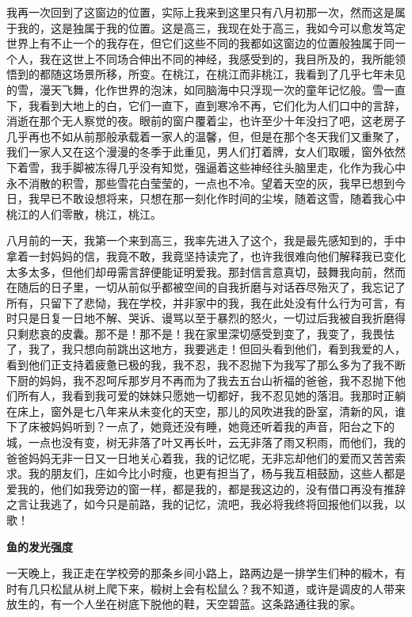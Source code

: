\documentclass{ctexbook}
\begin{document}
    我再一次回到了这窗边的位置，实际上我来到这里只有八月初那一次，然而这是属于我的，这是独属于我的位置。这是高三，我现在处于高三，我如今可以愈发笃定世界上有不止一个的我存在，但它们这些不同的我都如这窗边的位置般独属于同一个人，我在这世上不同场合伸出不同的神经，我感受到的，我目所及的，我所能领悟到的都随这场景所移，所变。在桃江，在桃江而非桃江，我看到了几乎七年未见的雪，漫天飞舞，化作世界的泡沫，如同脑海中只浮现一次的童年记忆般。雪一直下，我看到大地上的白，它们一直下，直到寒冷不再，它们化为人们口中的言辞，消逝在那个无人察觉的夜。眼前的窗户覆着尘，也许至少十年没扫了吧，这老房子几乎再也不如从前那般承载着一家人的温馨，但，但是在那个冬天我们又重聚了，我们一家人又在这个漫漫的冬季于此重见，男人们打着牌，女人们取暖，窗外依然下着雪，我手脚被冻得几乎没有知觉，强逼着这些神经往头脑里走，化作为我心中永不消散的积雪，那些雪花白莹莹的，一点也不冷。望着天空的灰，我早已想到今日，我早已不敢设想将来，只想在那一刻化作时间的尘埃，随着这雪，随着我心中桃江的人们零散，桃江，桃江。

    八月前的一天，我第一个来到高三，我率先进入了这个，我是最先感知到的，手中拿着一封妈妈的信，我竟不敢，我竟坚持读完了，也许我很难向他们解释我已变化太多太多，但他们却毋需言辞便能证明爱我。那封信言意真切，鼓舞我向前，然而在随后的日子里，一切从前似乎都被空间的自我折磨与对话吞尽殆灭了，我忘记了所有，只留下了悲恸，我在学校，并非家中的我，我在此处没有什么行为可言，有时只是日复一日地不解、哭诉、谩骂以至于暴烈的怒火，一切过后我被自我折磨得只剩悲哀的皮囊。那不是！那不是！我在家里深切感受到变了，我变了，我畏怯了，我了，我只想向前跳出这地方，我要逃走！但回头看到他们，看到我爱的人，看到他们正支持着疲惫已极的我，我不忍，我不忍抛下为我写了那么多为了我不断下厨的妈妈，我不忍呵斥那岁月不再而为了我去五台山祈福的爸爸，我不忍抛下他们所有人，我看到我可爱的妹妹只愿她一切都好，我不忍见她的落泪。我那时正躺在床上，窗外是七八年来从未变化的天空，那儿的风吹进我的卧室，清新的风，谁下了床被妈妈听到？一点了，她竟还没有睡，她竟还听着我的声音，阳台之下的城，一点也没有变，树无非落了叶又再长叶，云无非落了雨又积雨，而他们，我的爸爸妈妈无非一日又一日地关心着我，我的记忆呢，无非忘却他们的爱而又苦苦索求。我的朋友们，庄如今比小时瘦，也更有担当了，杨与我互相鼓励，这些人都是爱我的，他们如我旁边的窗一样，都是我的，都是我这边的，没有借口再没有推辞之言让我逃了，如今只是前路，我的记忆，流吧，我必将我终将回报他们以我，以歌！

\newpage

\textbf{鱼的发光强度}


\mbox


    一天晚上，我正走在学校旁的那条乡间小路上，路两边是一排学生们种的椴木，有时有几只松鼠从树上爬下来，椴树上会有松鼠么？我不知道，或许是调皮的人带来放生的，有一个人坐在树底下脱他的鞋，天空碧蓝。这条路通往我的家。
\end{document}
